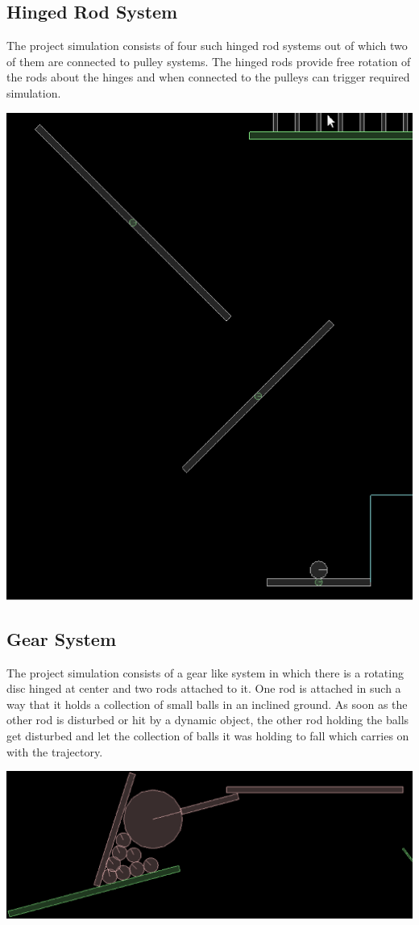 \documentclass[11pt]{article}
\begin{document}
\subsection{Hinged Rod System}
The project simulation consists of four such hinged rod systems out of which two of them are connected to pulley systems. The hinged rods provide free rotation of the rods about the hinges and when connected to the pulleys can trigger required simulation.
\begin{center}
\includegraphics[scale=0.5]{hinge}
\end{center}
\subsection{Gear System}
The project simulation consists of a gear like system in which there is a rotating disc hinged at center and two rods attached to it. One rod is attached in such a way that it holds a collection of small balls in an inclined ground. As soon as the other rod is disturbed or hit by a dynamic object, the other rod holding the balls get disturbed and let the collection of balls it was holding to fall which carries on with the trajectory.
\begin{center}
\includegraphics[scale=0.5]{gear}
\end{center} 
\end{document}
